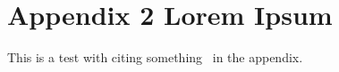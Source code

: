 

\chapter{Appendix 2 Lorem Ipsum}
\label{app:lorem_ipsum2}

This is a test with citing something~\cite{ecoop12-dias} in the appendix.

\lipsum[1-5]
